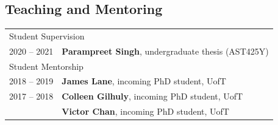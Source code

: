 \documentclass[10pt]{res} %
\begin{document}
\begin{resume}

\section{\Large Teaching and Mentoring}
\vspace{-5pt} %
\noindent\makebox[\linewidth]{\rule{\textwidth}{0.4pt}}
\vspace{-20pt} %
\begin{table}[h!]
\begin{tabularx}{\textwidth}{ @{} p{6.5em} X @{} }
% 
% 
\multicolumn{2}{l}{ \rule{0pt}{3ex} \large \hspace{-12pt} Student Supervision \dotfill \rule[-1.2ex]{0pt}{0pt}} \\
2020 -- 2021 & \textbf{Parampreet Singh}, undergraduate thesis (AST425Y) \\
% 
% 
\multicolumn{2}{l}{ \rule{0pt}{3ex} \large \hspace{-12pt} Student Mentorship \dotfill \rule[-1.2ex]{0pt}{0pt}} \\
2018 -- 2019 & \textbf{James Lane}, incoming PhD student, UofT \\
2017 -- 2018 & \textbf{Colleen Gilhuly}, incoming PhD student, UofT \\
                     & \textbf{Victor Chan}, incoming PhD student, UofT 
\end{tabularx}
\end{table}



\end{resume}
\end{document}
